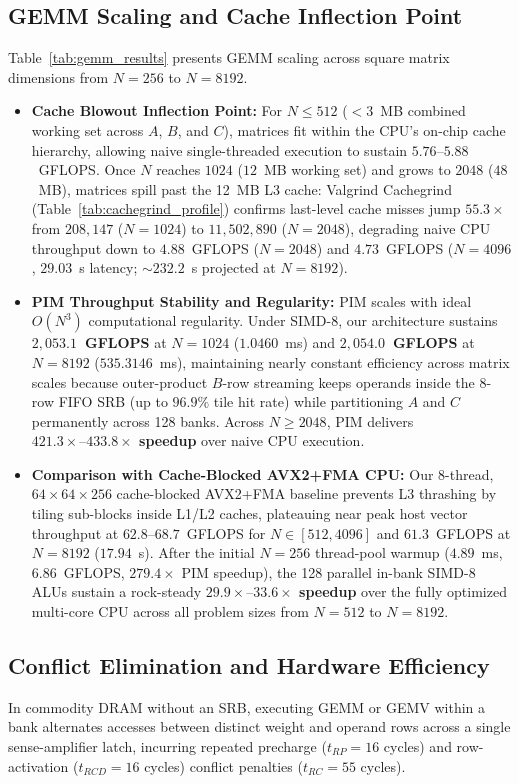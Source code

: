 \documentclass[conference]{IEEEtran}
\begin{document}
\subsection{GEMM Scaling and Cache Inflection Point}
Table~\ref{tab:gemm_results} presents GEMM scaling across square matrix dimensions from $N = 256$ to $N = 8192$.
\begin{itemize}
    \item \textbf{Cache Blowout Inflection Point:} For $N \le 512$ ($<3$~MB combined working set across $A$, $B$, and $C$), matrices fit within the CPU's on-chip cache hierarchy, allowing naive single-threaded execution to sustain $5.76\text{--}5.88$~GFLOPS. Once $N$ reaches $1024$ ($12$~MB working set) and grows to $2048$ ($48$~MB), matrices spill past the 12~MB L3 cache: Valgrind Cachegrind (Table~\ref{tab:cachegrind_profile}) confirms last-level cache misses jump $55.3\times$ from $208,147$ ($N=1024$) to $11,502,890$ ($N=2048$), degrading naive CPU throughput down to $4.88$~GFLOPS ($N=2048$) and $4.73$~GFLOPS ($N=4096$, $29.03$~s latency; $\sim 232.2$~s projected at $N=8192$).
    \item \textbf{PIM Throughput Stability and Regularity:} PIM scales with ideal $O(N^3)$ computational regularity. Under SIMD-8, our architecture sustains \textbf{$2,053.1$~GFLOPS} at $N=1024$ ($1.0460$~ms) and \textbf{$2,054.0$~GFLOPS} at $N=8192$ ($535.3146$~ms), maintaining nearly constant efficiency across matrix scales because outer-product $B$-row streaming keeps operands inside the 8-row FIFO SRB (up to $96.9\%$ tile hit rate) while partitioning $A$ and $C$ permanently across 128 banks. Across $N \ge 2048$, PIM delivers \textbf{$421.3\times\text{--}433.8\times$ speedup} over naive CPU execution.
    \item \textbf{Comparison with Cache-Blocked AVX2+FMA CPU:} Our 8-thread, $64 \times 64 \times 256$ cache-blocked AVX2+FMA baseline prevents L3 thrashing by tiling sub-blocks inside L1/L2 caches, plateauing near peak host vector throughput at $62.8\text{--}68.7$~GFLOPS for $N \in [512, 4096]$ and $61.3$~GFLOPS at $N=8192$ ($17.94$~s). After the initial $N=256$ thread-pool warmup ($4.89$~ms, $6.86$~GFLOPS, $279.4\times$ PIM speedup), the 128 parallel in-bank SIMD-8 ALUs sustain a rock-steady \textbf{$29.9\times\text{--}33.6\times$ speedup} over the fully optimized multi-core CPU across all problem sizes from $N=512$ to $N=8192$.
\end{itemize}

\subsection{Conflict Elimination and Hardware Efficiency}
In commodity DRAM without an SRB, executing GEMM or GEMV within a bank alternates accesses between distinct weight and operand rows across a single sense-amplifier latch, incurring repeated precharge ($t_{RP} = 16$ cycles) and row-activation ($t_{RCD} = 16$ cycles) conflict penalties ($t_{RC} = 55$ cycles).
\end{document}
